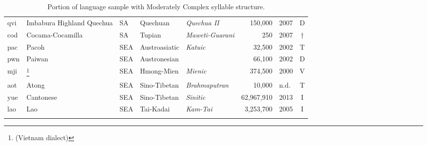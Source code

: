 \begin{table}
\begin{tabularx}{\textwidth}{lQlQQrlc}
 qvi & {{Imbabura Highland Quechua}} &  SA & {Quechuan} & {\textit{Quechua II}} &  150,000 & 2007 & D\\
 cod & {{Cocama-Cocamilla}} &  SA & {Tupian} & {\textit{Maweti-Guarani}} &  250 & 2007 & †\\
 pac & {{Pacoh}} &  SEA  & {Austroasiatic} & {\textit{Katuic}} &  32,500 & 2002 & T\\
 pwn & {{Paiwan}} &  SEA  & {Austronesian} &  &  66,100 & 2002 & D\\
 mji & {{\footnote{(Vietnam dialect)}}} &  SEA  & {Hmong-Mien} & {\textit{Mienic}} &  374,500 & 2000 & V\\
 aot & {{Atong}} &  SEA  & {Sino-Tibetan} & {\textit{Brahmaputran}} &  10,000 & n.d. & T\\
 yue & {{Cantonese}} &  SEA  & {Sino-Tibetan} & {\textit{Sinitic}} &  62,967,910 & 2013 & I\\
 lao & {{Lao}} &  SEA  & {Tai-Kadai} & {\textit{Kam-Tai}} &  3,253,700 & 2005 & I\\
\lspbottomrule
\end{tabularx}
\caption{Portion of language sample with Moderately Complex syllable structure.\label{tab:A.2}}
\end{table}


